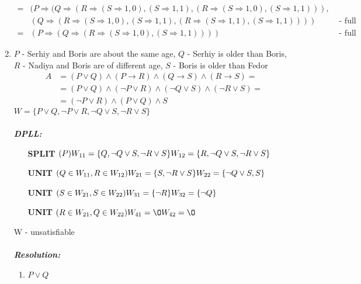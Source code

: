 \documentclass[a4paper,12pt]{article}
\begin{document}
\begin{enumerate}
\begin{align*}
		=&(P\Rightarrow(Q\Rightarrow(R\Rightarrow(S\Rightarrow 1,0),(S\Rightarrow 1,1),(R\Rightarrow(S\Rightarrow 1,0),(S\Rightarrow 1,1))),\\&(Q\Rightarrow(R\Rightarrow(S\Rightarrow 1,0),(S\Rightarrow 1,1),(R\Rightarrow(S\Rightarrow 1,1),(S\Rightarrow 1,1))))&\textrm{ - full unordered}\\
		=&(P\Rightarrow(Q\Rightarrow(R\Rightarrow(S\Rightarrow1,0),(S\Rightarrow1,1))))&\textrm{ - full ordered}
	\end{align*}
	\item 
	$P$ - Serhiy and Boris are about the same age, $Q$ - Serhiy is older than Boris, $R$ - Nadiya and Boris are of different age, $S$ - Boris is older than Fedor
	\begin{align*}
		A&=(P\lor Q)\land(P\to R)\land(Q\to S)\land (R\to S)=\\&=(P\lor Q)\land(\neg P\lor R)\land(\neg Q\lor S)\land (\neg R\lor S)=\\&=(\neg P\lor R)\land(P\lor Q)\land S
	\end{align*}
	$W=\{P\lor Q,\neg P\lor R,\neg Q\lor S,\neg R\lor S\}$
	\\\\\emph{\textbf{DPLL:}}\\
	\begin{itemize}
		\item [\textbf{SPLIT}] $(P)\\W_{11}=\{Q,\neg Q\lor S,\neg R\lor S\}\\W_{12}=\{R,\neg Q\lor S,\neg R\lor S\}$
		\item [\textbf{UNIT}] $(Q\in W_{11},R\in W_{12})\\W_{21}=\{S,\neg R\lor S\}\\W_{22}=\{\neg Q\lor S,S\}$
		\item [\textbf{UNIT}] $(S\in W_{21},S\in W_{22})\\W_{31}=\{\neg R\}\\W_{32}=\{\neg Q\}$
		\item [\textbf{UNIT}] $(R\in W_{21},Q\in W_{22})\\W_{41}=\O\\W_{42}=\O$
	\end{itemize}
	W - unsatisfiable
	\\\\\emph{\textbf{Resolution:}}\\
	\begin{multicols}{4}
		\begin{enumerate}[(1)]
			\item $P\lor Q$

\end{enumerate}
\end{multicols}
\end{enumerate}
\end{document}
